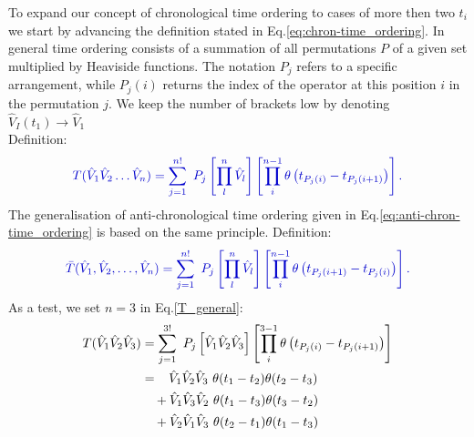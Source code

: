 \documentclass[
12pt, %
english, %
singlespacing, %
headsepline, %
]{MastersDoctoralThesis} %
\begin{document}
\begin{subappendices}
To expand our concept  of chronological time ordering to cases of more then  two $  t_{i} $ we start by advancing the definition stated in Eq.\enskip\eqref{eq:chron-time_ordering}.
In general time ordering consists of a summation of all permutations $ P $ of a given set multiplied by Heaviside functions. The notation $ P_{j} $ refers to a specific arrangement, while $ P_{j}(i) $ returns the index of the operator at this position $ i $ in the permutation $ j $. 
We keep the number of brackets low by denoting $ \hat{V}_{I}(t_{1}) \rightarrow \hat{V}_{1} $ \\
Definition:
\begin{equation}\label{T_general}
\textcolor[RGB]{0,0,204}{
T(\hat{V}_1 \hat{V}_2\ldots\hat{V}_n)=
\sum_{j=1}^{n!}\ P_{j}
\left[
\prod^{n}_{l}\hat{V}_{l}
 \right]  
\left[
\prod^{n-1}_{i}
\theta
	\left(
	t_{P_{j}(i)}-t_{P_{j}(i+1) }
	\right)
\right]
.
}
\end{equation}
The generalisation of anti-chronological time ordering given in Eq.\enskip\eqref{eq:anti-chron-time_ordering} is based on the same principle. 
Definition:
\begin{equation}\label{T_bar_general}
\textcolor[RGB]{0,0,204}{
\bar{T}(\hat{V}_1, \hat{V}_2,\ldots,\hat{V}_n)=
\sum_{j=1}^{n!}\ P_{j}
\left[
\prod^{n}_{l}\hat{V}_{l}
 \right]  
\left[
\prod^{n-1}_{i}
\theta
	\left(
	t_{P_{j}(i+1)}-t_{P_{j}(i)}
	\right)
\right]
 .
}
\end{equation}
As a test, we set $ n=3 $ in Eq.\enskip\eqref{T_general}:
\begin{equation}
\begin{split}
T(\hat{V}_1 \hat{V}_2\hat{V}_3)
&=
\sum_{j=1}^{3!}\ P_{j}
\left[
\hat{V}_1 \hat{V}_2\hat{V}_3
 \right]  
\left[
\prod^{3-1}_{i}
\theta
	\left(
	t_{P_{j}(i)}-t_{P_{j}(i+1) }
	\right)
\right]
\\
&=\enspace\thinspace\thinspace
\hat{V}_{1}\hat{V}_{2}\hat{V}_{3}\  \theta(t_{1}-t_{2}) \theta(t_{2}-t_{3})
	\\
	& \ \ \ +\hat{V}_{1}\hat{V}_{3}\hat{V}_{2}\   \theta(t_{1}-t_{3})\theta(t_{3}-t_{2})
	\\
	& \ \ \ +\hat{V}_{2}\hat{V}_{1}\hat{V}_{3} \  \theta(t_{2}-t_{1})\theta(t_{1}-t_{3})

\end{split}
\end{equation}
\end{subappendices}
\end{document}
